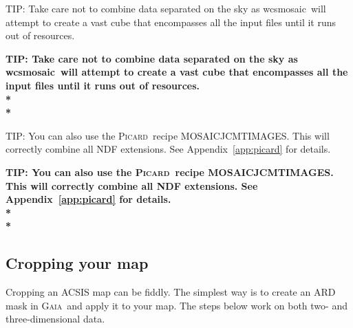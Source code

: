 \documentclass[twoside,11pt]{article}
\newcommand{\htmlref}[2]{#1}
\newenvironment{latexonly}{}{}
\newcommand{\latexhtml}[2]{#1}
\newcommand{\xref}[3]{#1}
\newcommand{\xlabel}[1]{}
\renewcommand{\_}{\texttt{\symbol{95}}}
\newenvironment{fmpage}[1]{\begin{lrbox}{\fmbox}\begin{minipage}{#1}}{\end{minipage}\end{lrbox}\fbox{\usebox{\fmbox}}}
\newcommand{\gaia}{\xref{\textsc{Gaia}}{sun214}{}}
\newcommand{\picard}{\xref{\textsc{Picard}}{sun265}{}}
\newcommand{\task}[1]{\textsf{#1}}
\newcommand{\wcsmosaic}{\xref{\task{wcsmosaic}}{sun95}{WCSMOSAIC}}
\newcommand{\cref}[3]{\latexhtml{#1~\ref{#2}}{\htmlref{#3}{#2}}}
\begin{document}
\begin{latexonly}
\begin{center}
\begin{fmpage}{0.95\linewidth}
\vspace{0.1cm}
TIP: Take care not to combine data separated on the sky as \wcsmosaic\ will attempt to create a vast cube that encompasses all the input files until it runs out of resources.
\end{fmpage}
\end{center}
\end{latexonly}

\begin{htmlonly}
\textbf{TIP: Take care not to combine data separated on the sky as \wcsmosaic\ will attempt to create a vast cube that encompasses all the input files until it runs out of resources.\\*\\*}
\end{htmlonly}


\begin{latexonly}
\begin{center}
\begin{fmpage}{0.95\linewidth}
\vspace{0.1cm}
TIP: You can also use the \picard\ recipe MOSAIC\_JCMT\_IMAGES. This will correctly combine all NDF extensions. See \cref{Appendix}{app:picard}{Picard} for details. 
\end{fmpage}
\end{center}
\end{latexonly}

\begin{htmlonly}
\textbf{TIP: You can also use the \picard\ recipe MOSAIC\_JCMT\_IMAGES. This will correctly combine all NDF extensions. See \cref{Appendix}{app:picard}{Picard} for details. \\*\\*}
\end{htmlonly}


\subsection{\xlabel{Crop}Cropping your map}
\label{sec:collapse}
Cropping an ACSIS map can be fiddly. The simplest way is to create an ARD mask in \gaia\ and apply it to your map. The steps below work on both two- and three-dimensional data.
\end{document}
